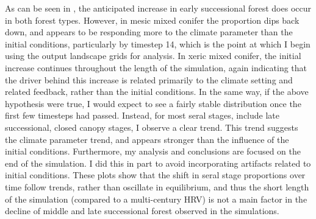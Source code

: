 As can be seen in , the anticipated increase in early successional forest does occur in both forest types. However, in mesic mixed conifer the proportion dips back down, and appears to be responding more to the climate parameter than the initial conditions, particularly by timestep 14, which is the point at which I begin using the output landscape grids for analysis. In xeric mixed conifer, the initial increase continues throughout the length of the simulation, again indicating that the driver behind this increase is related primarily to the climate setting and related feedback, rather than the initial conditions. In the same way, if the above hypothesis were true, I would expect to see a fairly stable distribution once the first few timesteps had passed. Instead, for most seral stages, include late successional, closed canopy stages, I observe a clear trend. This trend suggests the climate parameter trend, and appears stronger than the influence of the initial conditions. Furthermore, my analysis and conclusions are focused on the end of the simulation. I did this in part to avoid incorporating artifacts related to initial conditions. These plots show that the shift in seral stage proportions over time follow trends, rather than oscillate in equilibrium, and thus the short length of the simulation (compared to a multi-century HRV) is not a main factor in the decline of middle and late successional forest observed in the simulations.



